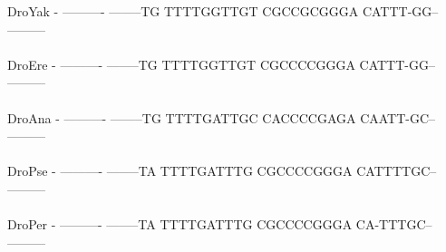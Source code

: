 \documentclass[11pt,twoside,reqno,a4paper]{article}
\begin{document}
{DroYak	-	----------	--------TG	TTTTGGTTGT	CGCCGCGGGA	CATTT-GG--	---------\\
\hspace*{7\charwidth}\hspace*{1\charwidth}\hspace*{1\charwidth}\hspace*{1\charwidth}\hspace*{1\charwidth}\hspace*{1\charwidth}\hspace*{1\charwidth}\\
DroEre	-	----------	--------TG	TTTTGGTTGT	CGCCCCGGGA	CATTT-GG--	---------\\
\hspace*{7\charwidth}\hspace*{1\charwidth}\hspace*{1\charwidth}\hspace*{1\charwidth}\hspace*{1\charwidth}\hspace*{1\charwidth}\hspace*{1\charwidth}\\
DroAna	-	----------	--------TG	TTTTGATTGC	CACCCCGAGA	CAATT-GC--	---------\\
\hspace*{7\charwidth}\hspace*{1\charwidth}\hspace*{1\charwidth}\hspace*{1\charwidth}\hspace*{1\charwidth}\hspace*{1\charwidth}\hspace*{1\charwidth}\\
DroPse	-	----------	--------TA	TTTTGATTTG	CGCCCCGGGA	CATTTTGC--	---------\\
\hspace*{7\charwidth}\hspace*{1\charwidth}\hspace*{1\charwidth}\hspace*{1\charwidth}\hspace*{1\charwidth}\hspace*{1\charwidth}\hspace*{1\charwidth}\\
DroPer	-	----------	--------TA	TTTTGATTTG	CGCCCCGGGA	CA-TTTGC--	---------\\
\hspace*{7\charwidth}\hspace*{1\charwidth}\hspace*{1\charwidth}\hspace*{1\charwidth}\hspace*{1\charwidth}\hspace*{1\charwidth}\hspace*{1\charwidth}\\
}
\end{document}

